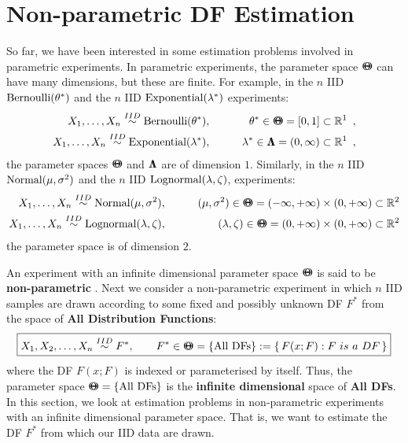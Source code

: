 \section{Non-parametric DF Estimation}\label{S:NonparamDFEstimation}
So far, we have been interested in some estimation problems involved in parametric experiments.  In parametric experiments, the parameter space ${\Theta}\mspace{-11 mu}{\Theta}$ can have many dimensions, but these are finite.  For example, in the $n$ IID $\mbox{{\rm Bernoulli}}(\theta^*)$ and the $n$ IID $\mbox{{\rm Exponential}}(\lambda^*)$ experiments:
\begin{eqnarray*}
X_1,\ldots,X_n \overset{IID}{\sim} \mbox{{\rm Bernoulli}}(\theta^*), & \qquad & \theta^* \in {\Theta}\mspace{-11 mu}{\Theta}=[0,1] \subset \mathbb{R}^1 \enspace , \\
X_1,\ldots,X_n \overset{IID}{\sim} \mbox{{\rm Exponential}}(\lambda^*), & \qquad & \lambda^* \in {\Lambda}\mspace{-11 mu}{\Lambda}=(0,\infty) \subset \mathbb{R}^1 \enspace ,
\end{eqnarray*}
the parameter spaces ${\Theta}\mspace{-11 mu}{\Theta}$ and ${\Lambda}\mspace{-11 mu}{\Lambda}$ are of dimension $1$.  Similarly, in the $n$ IID $\mbox{{\rm Normal}}(\mu,{\sigma}^2)$ and the $n$ IID $\mbox{{\rm Lognormal}}(\lambda,\zeta)$, experiments:
\begin{eqnarray*}
X_1,\ldots,X_n \overset{IID}{\sim} \mbox{{\rm Normal}}(\mu,\sigma^2), &\qquad & (\mu,\sigma^2) \in {\Theta}\mspace{-11 mu}{\Theta}=(-\infty,+\infty) \times (0,+\infty) \subset \mathbb{R}^2 \\
X_1,\ldots,X_n \overset{IID}{\sim} \mbox{{\rm Lognormal}}(\lambda,\zeta), &\qquad & (\lambda,\zeta) \in {\Theta}\mspace{-11 mu}{\Theta}=(0,+\infty) \times (0,+\infty) \subset \mathbb{R}^2 
\end{eqnarray*}
the parameter space is of dimension $2$.

An experiment with an infinite dimensional parameter space ${\Theta}\mspace{-11 mu}{\Theta}$ is said to be {\bf non-parametric} .  Next we consider a non-parametric experiment in which $n$ IID samples are drawn according to some fixed and possibly unknown DF $F^*$ from the space of {\bf All Distribution Functions}:
\[
\boxed{
X_1,X_2,\ldots,X_n \overset{IID}{\sim} F^*, \qquad F^* \in {\Theta}\mspace{-11 mu}{\Theta} = \{ \text{All DFs}\} := \{ \,  F(x; F) :  F~is~a~DF \, \} 
}
\]
where the DF $F(x; F)$ is indexed or parameterised by itself. Thus, the parameter space ${\Theta}\mspace{-11 mu}{\Theta}=\{ \text{All DFs}\}$ is the {\bf infinite dimensional} space of {\bf All DFs}.  In this section, we look at estimation problems in non-parametric experiments with an infinite dimensional parameter space.  That is, we want to estimate the DF $F^*$ from which our IID data are drawn.

